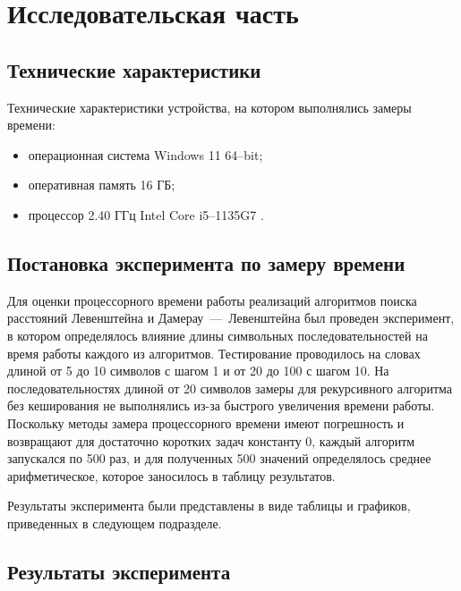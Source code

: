 \chapter{Исследовательская часть}

\section{Технические характеристики}

Технические характеристики устройства, на котором выполнялись замеры времени:

\begin{itemize}
	\item операционная система Windows 11 64--bit;
	\item оперативная память 16 ГБ;
	\item процессор 2.40 ГГц Intel Core i5--1135G7 \cite{intel}.
\end{itemize}

\section{Постановка эксперимента по замеру времени}

Для оценки процессорного времени работы реализаций алгоритмов поиска расстояний Левенштейна и Дамерау~---~Левенштейна был проведен эксперимент, в котором определялось влияние длины символьных последовательностей на время работы каждого из алгоритмов. Тестирование проводилось на словах длиной от 5 до 10 символов с шагом 1 и от 20 до 100 с шагом 10. На последовательностях длиной от 20 символов замеры для рекурсивного алгоритма без кеширования не выполнялись из-за быстрого увеличения времени работы. Поскольку методы замера процессорного времени имеют погрешность и возвращают для достаточно коротких задач константу 0, каждый алгоритм запускался по 500 раз, и для полученных 500 значений определялось среднее арифметическое, которое заносилось в таблицу результатов.

Результаты эксперимента были представлены в виде таблицы и графиков, приведенных
в следующем подразделе.

\clearpage

\section{Результаты эксперимента}

